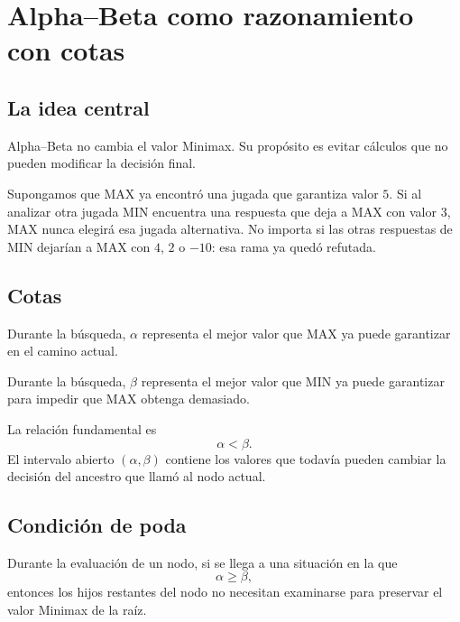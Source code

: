 \chapter{Alpha--Beta como razonamiento con cotas}

\section{La idea central}

Alpha--Beta no cambia el valor Minimax. Su propósito es evitar cálculos que no pueden modificar la decisión final.

\begin{intuitionbox}
Supongamos que MAX ya encontró una jugada que garantiza valor $5$. Si al analizar otra jugada MIN encuentra una respuesta que deja a MAX con valor $3$, MAX nunca elegirá esa jugada alternativa. No importa si las otras respuestas de MIN dejarían a MAX con $4$, $2$ o $-10$: esa rama ya quedó refutada.
\end{intuitionbox}

\section{Cotas}

\begin{definition}
Durante la búsqueda, $\alpha$ representa el mejor valor que MAX ya puede garantizar en el camino actual.
\end{definition}

\begin{definition}
Durante la búsqueda, $\beta$ representa el mejor valor que MIN ya puede garantizar para impedir que MAX obtenga demasiado.
\end{definition}

\begin{formalbox}
La relación fundamental es
\[
\alpha < \beta.
\]
El intervalo abierto $(\alpha,\beta)$ contiene los valores que todavía pueden cambiar la decisión del ancestro que llamó al nodo actual.
\end{formalbox}

\section{Condición de poda}

\begin{theorem}
Durante la evaluación de un nodo, si se llega a una situación en la que
\[
\alpha \ge \beta,
\]
entonces los hijos restantes del nodo no necesitan examinarse para preservar el valor Minimax de la raíz.
\end{theorem}

